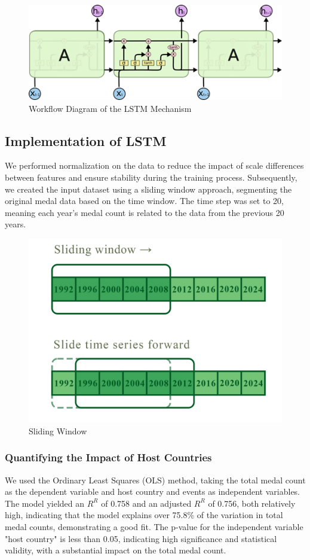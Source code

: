 \documentclass{mcmthesis}
\begin{document}
\begin{figure}[H]
    \centering
    \includegraphics[width=12cm]{graph/workflow.png}
    \caption{Workflow Diagram of the LSTM Mechanism} \label{Figure 4}
\end{figure}

\subsection{Implementation of LSTM}
We performed normalization on the data to reduce the impact of scale differences between features and ensure stability during the training process. Subsequently, we created the input dataset using a sliding window approach, segmenting the original medal data based on the time window. The time step was set to 20, meaning each year's medal count is related to the data from the previous 20 years.
\begin{figure}[H]
    \centering
    \includegraphics[width=12cm]{graph/sliding_window.png}
    \caption{Sliding Window} \label{Figure 4}
\end{figure}

\subsubsection{Quantifying the Impact of Host Countries}
We used the Ordinary Least Squares (OLS) method, taking the total medal count as the dependent variable and host country and events as independent variables. The model yielded an $R^{R}$ of 0.758 and an adjusted $R^{R}$ of 0.756, both relatively high, indicating that the model explains over 75.8\% of the variation in total medal counts, demonstrating a good fit. The p-value for the independent variable "host country" is less than 0.05, indicating high significance and statistical validity, with a substantial impact on the total medal count.
\end{document}
